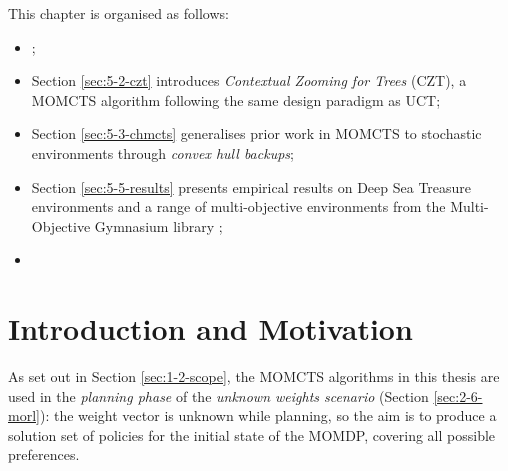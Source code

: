     This chapter is organised as follows:
    \begin{itemize}
        \item {};
        \item Section \ref{sec:5-2-czt} introduces 
            \textit{Contextual Zooming for Trees} (CZT), a 
            MOMCTS algorithm following the same design paradigm 
            as UCT;
        \item Section \ref{sec:5-3-chmcts} generalises prior work 
            in MOMCTS to stochastic environments through 
            \textit{convex hull backups};
        \item Section \ref{sec:5-5-results} presents empirical 
            results on Deep Sea Treasure environments and a range 
            of multi-objective environments from the 
            Multi-Objective Gymnasium library \cite{mo_gym};
        \item {}
    \end{itemize}

















\section{Introduction and Motivation}
\label{sec:5-1-intro}

    As set out in Section \ref{sec:1-2-scope}, the MOMCTS algorithms in this thesis are used in the \textit{planning phase} of the \textit{unknown weights scenario} (Section \ref{sec:2-6-morl}): the weight vector is unknown while planning, so the aim is to produce a solution set of policies for the initial state of the MOMDP, covering all possible preferences. 

